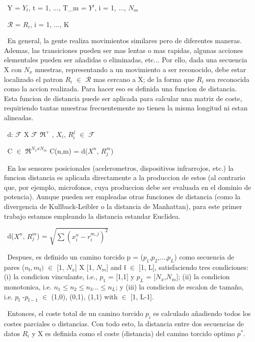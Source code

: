 \documentclass{paper}
\begin{document}
\ Y = {$Y_t$, t = 1, ..., T_m} = {$Y^i$, i = 1, ..., $N_m$}

\ $\mathcal{R}$ = {$R_i$, i = 1, ..., K}

\ En general, la gente realiza movimientos similares pero de diferentes maneras. Ademas, las transiciones pueden ser mas lentas o mas rapidas, algunas acciones elementales pueden ser añadidas o eliminadas, etc... Por ello, dada una secuencia X con $N_x$ muestras, representando a un movimiento a ser reconocido, debe estar localizado el patron $R_i$ $\in$ $\mathcal{R}$ mas cercano a X; de la forma que $R_i$ sea reconocida como la accion realizada. Para hacer eso es definida una funcion de distancia. Esta funcion de distancia puede ser aplicada para calcular una matriz de coste, requiriendo tantas muestras frecuentemente no tienen la misma longitud ni estan alineadas.

\ d: $\mathcal{F}$ X $\mathcal{F}$  \longrightarrow $\mathfrak{R}^+$   ,    $X_i$, $R_i^j$ $\in$ $\mathcal{F}$

\ C $\in$ $\mathfrak{R}^{N_x x N_m}$  C(n,m) = d($X^n$, $R^m_j$)

\ En los sensores posicionales (acelerometros, dispositivos infrarrojos, etc.) la funcion distancia es aplicada directamente a la produccion de estos (al contrario que, por ejemplo, microfonos, cuya produccion debe ser evaluada en el dominio de potencia). Aunque pueden ser empleadas otras funciones de distancia (como la divergencia de Kullback-Leibler o la distancia de Manhattan), para este primer trabajo estamos empleando la distancia estandar Euclidea.

\ d($X^n$, $R_j^m$) = $\sqrt{
\sum(x_i^n - r_i^{m,j})^2}$

\ Despues, es definido un camino torcido  p = ($p_1$,$p_2$,...,$p_L$) como secuencia de pares ($n_\mathfrak{l}, m_\mathfrak{l})$ $\in$ [1, $N_x$] X [1, $N_m$] and $\mathfrak{l}$ $\in$ [1, L], satisfaciendo tres condiciones: (i) la condicion vinculante, i.e., $p_1$ = [1,1] y $p_L$ = [$N_x$,$N_m$]; (ii) la condicion monotonica, i.e. $n_1 \leq n_2  \leq n_3 ...  \leq n_L$; y (iii) la condicion de escalon de tamaño, i.e. $p_\mathfrak{l}$ -$p_{\mathfrak{l}-1}$ $\in$ {(1,0), (0,1), (1,1)} with  $\in$ [1, L-1].

\ Entonces, el coste total de un camino torcido $p_i$ es calculado añadiendo todos los costes parciales o distancias. Con todo esto, la distancia entre dos secuencias de datos $R_i$ y X es definida como el coste (distancia) del camino torcido optimo $p^*$.
\end{document}
